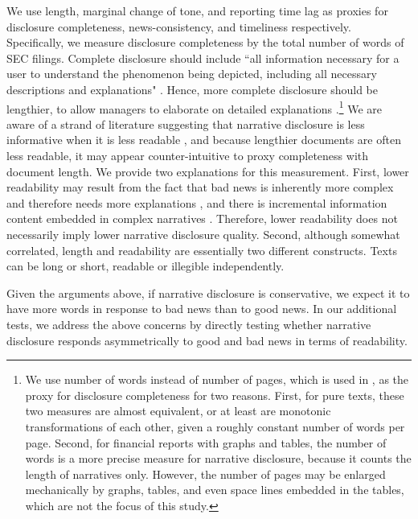 \documentclass[letterpaper,12pt]{article}
\begin{document}
\begin{spacing}{1.5}
\noindent We use length, marginal change of tone, and reporting time lag as proxies for disclosure completeness, news-consistency, and timeliness respectively. Specifically, we measure disclosure completeness by the total number of words of SEC filings. Complete disclosure should include ``all information necessary for a user to understand the phenomenon being depicted, including all necessary descriptions and explanations" \cite[QC12]{fasbConceptualFrameworkFinancial2018}. Hence, more complete disclosure should be lengthier, to allow managers to elaborate on detailed explanations  \cite{leuzDisclosureCostCapital2009}.\footnote{We use number of words instead of number of pages, which is used in , as the proxy for disclosure completeness for two reasons. First, for pure texts, these two measures are almost equivalent, or at least are monotonic transformations of each other, given a roughly constant number of words per page. Second, for financial reports with graphs and tables, the number of words is a more precise measure for narrative disclosure, because it counts the length of narratives only. However, the number of pages may be enlarged mechanically by graphs, tables, and even space lines embedded in the tables, which are not the focus of this study.} We are aware of a strand of literature suggesting that narrative disclosure is less informative when it is less readable \cite{liAnnualReportReadability2008, loEarningsManagementAnnual2017, loughranMeasuringReadabilityFinancial2014}, and because lengthier documents are often less readable, it may appear counter-intuitive to proxy completeness with document length. We provide two explanations for this measurement. First, lower readability may result from the fact that bad news is inherently more complex and therefore needs more explanations \cite{bloomfieldDiscussionAnnualReport2008}, and there is incremental information content embedded in complex narratives \cite{busheeLinguisticComplexityFirm2018}. Therefore, lower readability does not necessarily imply lower narrative disclosure quality. Second, although somewhat correlated, length and readability are essentially two different constructs. Texts can be long or short, readable or illegible independently. %

Given the arguments above, if narrative disclosure is conservative, we expect it to have more words in response to bad news than to good news. In our additional tests, we address the above concerns by directly testing whether narrative disclosure responds asymmetrically to good and bad news in terms of readability.


\end{spacing}
\end{document}
